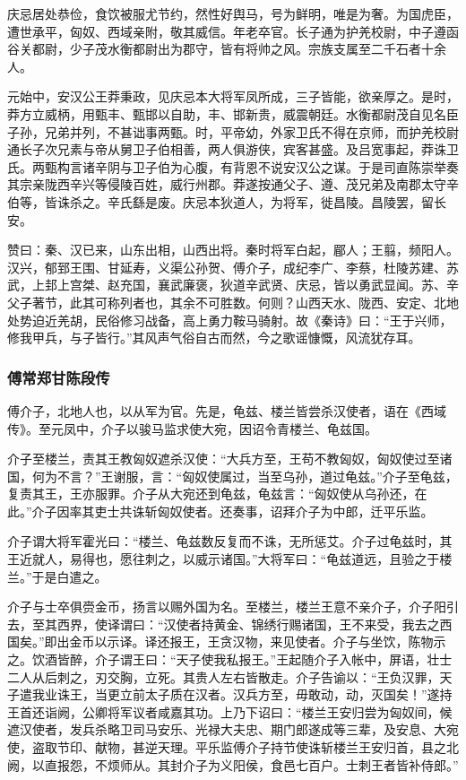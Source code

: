 \documentclass[]{article}
\begin{document}
庆忌居处恭俭，食饮被服尤节约，然性好舆马，号为鲜明，唯是为奢。为国虎臣，遭世承平，匈奴、西域亲附，敬其威信。年老卒官。长子通为护羌校尉，中子遵函谷关都尉，少子茂水衡都尉出为郡守，皆有将帅之风。宗族支属至二千石者十余人。

元始中，安汉公王莽秉政，见庆忌本大将军凤所成，三子皆能，欲亲厚之。是时，莽方立威柄，用甄丰、甄邯以自助，丰、邯新贵，威震朝廷。水衡都尉茂自见名臣子孙，兄弟并列，不甚诎事两甄。时，平帝幼，外家卫氏不得在京师，而护羌校尉通长子次兄素与帝从舅卫子伯相善，两人俱游侠，宾客甚盛。及吕宽事起，莽诛卫氏。两甄构言诸辛阴与卫子伯为心腹，有背恩不说安汉公之谋。于是司直陈崇举奏其宗亲陇西辛兴等侵陵百姓，威行州郡。莽遂按通父子、遵、茂兄弟及南郡太守辛伯等，皆诛杀之。辛氏繇是废。庆忌本狄道人，为将军，徙昌陵。昌陵罢，留长安。

赞曰：秦、汉已来，山东出相，山西出将。秦时将军白起，郿人；王翦，频阳人。汉兴，郁郅王围、甘延寿，义渠公孙贺、傅介子，成纪李广、李蔡，杜陵苏建、苏武，上邽上宫桀、赵充国，襄武廉褒，狄道辛武贤、庆忌，皆以勇武显闻。苏、辛父子著节，此其可称列者也，其余不可胜数。何则？山西天水、陇西、安定、北地处势迫近羌胡，民俗修习战备，高上勇力鞍马骑射。故《秦诗》曰：``王于兴师，修我甲兵，与子皆行。''其风声气俗自古而然，今之歌谣慷慨，风流犹存耳。

\hypertarget{header-n5131}{%
\subsubsection{傅常郑甘陈段传}\label{header-n5131}}

傅介子，北地人也，以从军为官。先是，龟兹、楼兰皆尝杀汉使者，语在《西域传》。至元凤中，介子以骏马监求使大宛，因诏令青楼兰、龟兹国。

介子至楼兰，责其王教匈奴遮杀汉使：``大兵方至，王苟不教匈奴，匈奴使过至诸国，何为不言？''王谢服，言：``匈奴使属过，当至乌孙，道过龟兹。''介子至龟兹，复责其王，王亦服罪。介子从大宛还到龟兹，龟兹言：``匈奴使从乌孙还，在此。''介子因率其吏士共诛斩匈奴使者。还奏事，诏拜介子为中郎，迁平乐监。

介子谓大将军霍光曰：``楼兰、龟兹数反复而不诛，无所惩艾。介子过龟兹时，其王近就人，易得也，愿往刺之，以威示诸国。''大将军曰：``龟兹道远，且验之于楼兰。''于是白遣之。

介子与士卒俱赍金币，扬言以赐外国为名。至楼兰，楼兰王意不亲介子，介子阳引去，至其西界，使译谓曰：``汉使者持黄金、锦绣行赐诸国，王不来受，我去之西国矣。''即出金币以示译。译还报王，王贪汉物，来见使者。介子与坐饮，陈物示之。饮酒皆醉，介子谓王曰：``天子使我私报王。''王起随介子入帐中，屏语，壮士二人从后刺之，刃交胸，立死。其贵人左右皆散走。介子告谕以：``王负汉罪，天子遣我业诛王，当更立前太子质在汉者。汉兵方至，毋敢动，动，灭国矣！''遂持王首还诣阙，公卿将军议者咸嘉其功。上乃下诏曰：``楼兰王安归尝为匈奴间，候遮汉使者，发兵杀略卫司马安乐、光禄大夫忠、期门郎遂成等三辈，及安息、大宛使，盗取节印、献物，甚逆天理。平乐监傅介子持节使诛斩楼兰王安归首，县之北阙，以直报怨，不烦师从。其封介子为义阳侯，食邑七百户。士刺王者皆补侍郎。''
\end{document}
